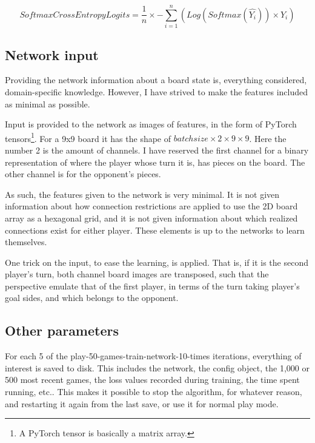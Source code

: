 \begin{equation}
SoftmaxCrossEntropyLogits = \frac{1}{n} \times -\sum_{i = 1}^{n} \left( Log(Softmax(\hat{Y_i})) \times Y_i\right)
\label{eq-softmax-cross-entropy}
\end{equation}

\subsection{Network input}
Providing the network information about a board state is, everything considered, domain-specific knowledge. However, I have strived to make the features included as minimal as possible. 

Input is provided to the network as images of features, in the form of PyTorch tensors\footnote{A PyTorch tensor is basically a matrix array.}. For a 9x9 board it has the shape of $batch size \times 2  \times 9 \times 9$. Here the number 2 is the amount of channels. I have reserved the first channel for a binary representation of where the player whose turn it is, has pieces on the board. The other channel is for the opponent's pieces. 

As such, the features given to the network is very minimal. It is not given information about how connection restrictions are applied to use the 2D board array as a hexagonal grid, and it is not given information about which realized connections exist for either player. These elements is up to the networks to learn themselves.

One trick on the input, to ease the learning, is applied. That is, if it is the second player's turn, both channel board images are transposed, such that the perspective emulate that of the first player, in terms of the turn taking player's goal sides, and which belongs to the opponent.

\subsection{Other parameters}
For each 5 of the play-50-games-train-network-10-times iterations, everything of interest is saved to disk. This includes the network, the config object, the 1,000 or 500 most recent games, the loss values recorded during training, the time spent running, etc.. This makes it possible to stop the algorithm, for whatever reason, and restarting it again from the last save, or use it for normal play mode.
